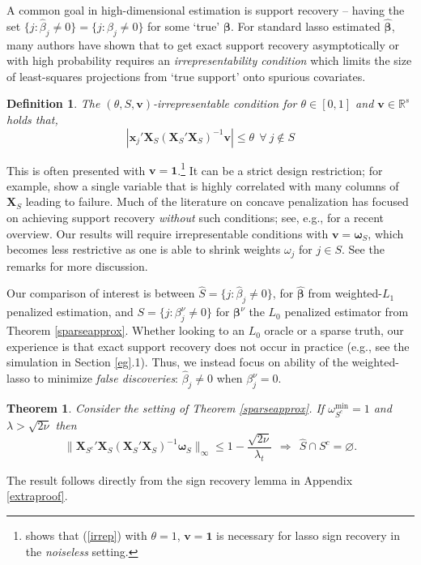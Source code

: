 \documentclass[12pt]{article}
\newtheorem{theorem}{\sc Theorem}[section]
\newtheorem{definition}{\sc Definition}[section]
\newcommand{\bs}[1]{\boldsymbol{#1}}
\newcommand{\mr}[1]{\mathrm{#1}}
\newcommand{\bm}[1]{\mathbf{#1}}
\newcommand{\ds}[1]{\mathds{#1}}
\begin{document}
A common goal in high-dimensional estimation is  support recovery -- having the set $\{j: \hat\beta_j \neq 0\} = \{j: \beta_j \neq 0\}$ for some `true' $\bs{\beta}$.
For standard lasso estimated $\bs{\hat\beta}$, many authors have shown \citep[e.g.,][]{buhlmann_statistics_2011,zou_adaptive_2006} that to get exact support recovery asymptotically or with high probability requires an {\it irrepresentability condition} which limits the size of least-squares projections from `true support' onto spurious covariates.  
\begin{definition} 
The $(\theta,S,\bm{v})$-irrepresentable condition for $\theta\in[0,1]$ and $\bm{v}\in \ds{R}^s$ holds that, 
\begin{equation}\label{irrep}
|\bs{x}_j'\bm{X}_S(\bm{X}_S'\bm{X}_S)^{-1}\bm{v}| \leq \theta ~~\forall~j\notin S
\end{equation}
\end{definition}
\noindent This is often presented with $\bm{v}=\bm{1}$.\footnote{\cite{wainwright_sharp_2009} shows that (\ref{irrep}) with $\theta=1$, $\bm{v}=\bm{1}$ is necessary for lasso sign recovery in the {\it noiseless} setting.} It
can be a strict design restriction; for example,
\citet{buhlmann_statistics_2011} show a single variable that is
highly correlated with many columns of $\bm{X}_S$ leading to failure. Much
of the literature on concave penalization has focused on achieving
support recovery {\it without} such conditions; see, e.g.,
\cite{fan_strong_2014} for a recent overview.  
Our results will require irrepresentable conditions with $\bm{v} =
\bs{\omega}_S$, which becomes less restrictive as one is able to shrink
weights $\omega_j$ for $j\in S$.  See the remarks for more discussion.

Our comparison of interest is between $\hat S = \{j:
\hat\beta_j \neq 0\}$, for $\bs{\hat\beta}$ from weighted-$L_1$ penalized
estimation, and $S = \{j:
\beta^\nu_j \neq 0\}$ for $\bs{\beta}^\nu$ the $L_0$ penalized estimator from
Theorem \ref{sparseapprox}. Whether looking to an $L_0$ oracle or a sparse
truth, our experience is that exact support recovery does not occur in
practice   (e.g., see the simulation in Section \ref{eg}.1).  Thus, we instead 
focus on ability of the weighted-lasso to minimize {\it false discoveries}:
$\hat\beta_j
\neq 0$ when $\beta^\nu_j=0$. 

\begin{theorem}
Consider the setting of Theorem \ref{sparseapprox}. 
If $\omega_{S^c}^{\mr{min}} = 1$ and $\lambda > \sqrt{2\nu}$ then
\begin{equation}\label{falsepos}
\|\bm{X}_{S^c}'\bm{X}_S(\bm{X}_S'\bm{X}_S)^{-1}\bs{\omega}_S\|_{\infty} \leq 1 - \frac{\sqrt{2\nu}}{\lambda_t} ~~\Rightarrow~~\hat S \cap S^c = \varnothing.
\end{equation}
\end{theorem}
\noindent The result follows directly from the sign recovery lemma in Appendix
\ref{extraproof}. 
\end{document}

